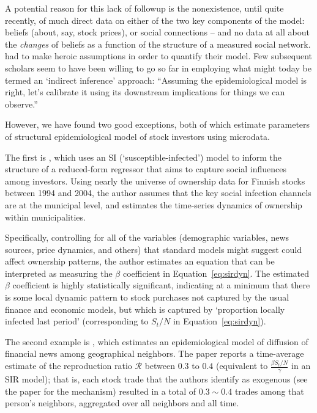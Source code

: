 A potential reason for this lack of followup is the nonexistence, until quite recently, of much direct data on either of the two key components of the model: beliefs (about, say, stock prices), or social connections -- and no data at all about the \textit{changes} of beliefs as a function of the structure of a measured social network.  \cite{shiller1989survey} had to make heroic assumptions in order to quantify their model.  Few subsequent scholars seem to have been willing to go so far in employing what might today be termed an `indirect inference' approach: ``Assuming the epidemiological model is right, let's calibrate it using its downstream implications for things we can observe.''

However, we have found two good exceptions, both of which estimate parameters of structural epidemiological model of stock investors using microdata.

The first is  \href{https://github.com/iworld1991/EpiExp/blob/master/Literature/shive2010epidemic.pdf}{\cite{shive2010epidemic}}, which uses an SI (`susceptible-infected') model to inform the structure of a reduced-form regressor that aims to capture social influences among investors.  Using nearly the universe of ownership data for Finnish stocks between 1994 and 2004, the author assumes that the key social infection channels are at the municipal level, and estimates the time-series dynamics of ownership within municipalities.

Specifically, controlling for all of the variables (demographic variables, news sources, price dynamics, and others) that standard models might suggest could affect ownership patterns, the author estimates an equation that can be interpreted as measuring the $\beta$ coefficient in Equation~\eqref{eq:sirdyn}.  The estimated $\beta$ coefficient is highly statistically significant, indicating at a minimum that there is some local dynamic pattern to stock purchases not captured by the usual finance and economic models, but which is captured by `proportion locally infected last period' (corresponding to $S_t/N$ in Equation~\eqref{eq:sirdyn}).  %

The second example is \href{https://github.com/iworld1991/EpiExp/blob/master/Literature/huang2021rate.pdf}{ \cite{huang2021rate}}, which estimates an epidemiological model of diffusion of financial news among geographical neighbors. The paper reports a time-average estimate of the reproduction ratio $\mathcal{R}$ between $0.3$ to $0.4$ (equivalent to $\frac{\beta S_t/N}{\gamma}$ in an SIR model); that is, each stock trade that the authors identify as exogenous (see the paper for the mechanism) resulted in a total of $0.3{\sim}0.4$ trades among that person's neighbors, aggregated over all neighbors and all time.

